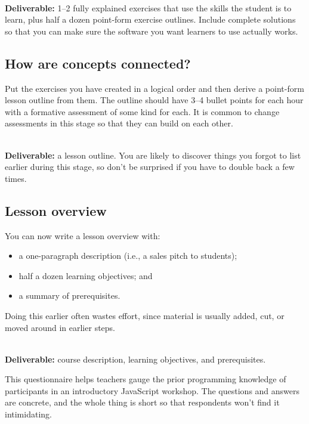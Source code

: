 ~\\
\noindent
\textbf{Deliverable:} 1--2 fully explained exercises
that use the skills the student is to learn,
plus half a dozen point-form exercise outlines.
Include complete solutions
so that you can make sure the software you want learners to use actually works.

\subsection*{How are concepts connected?}

Put the exercises you have created in a logical order
and then derive a point-form lesson outline from them.
The outline should have 3--4 bullet points for each hour
with a formative assessment of some kind for each.
It is common to change assessments in this stage
so that they can build on each other.

~\\
\noindent
\textbf{Deliverable:} a lesson outline.
You are likely to discover things you forgot to list earlier during this stage,
so don't be surprised if you have to double back a few times.

\subsection*{Lesson overview}

You can now write a lesson overview with:

\begin{itemize}

\item
  a one-paragraph description (i.e., a sales pitch to students);

\item
  half a dozen learning objectives; and

\item
  a summary of prerequisites.

\end{itemize}

Doing this earlier often wastes effort,
since material is usually added, cut, or moved around in earlier steps.

~\\
\noindent
\textbf{Deliverable:}
course description,
learning objectives,
and prerequisites.


This questionnaire helps teachers gauge the prior programming knowledge
of participants in an introductory JavaScript workshop.
The questions and answers are concrete,
and the whole thing is short so that respondents won't find it intimidating.

